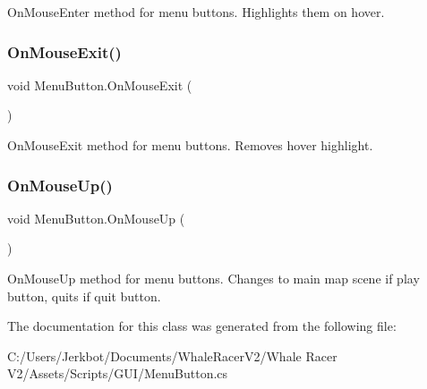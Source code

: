 On\+Mouse\+Enter method for menu buttons. Highlights them on hover. 

\mbox{\label{class_menu_button_afae57d1cdf53ab95aaad3ffafcdd5682}} 
\subsubsection{\texorpdfstring{On\+Mouse\+Exit()}{OnMouseExit()}}
{\footnotesize\ttfamily void Menu\+Button.\+On\+Mouse\+Exit (\begin{DoxyParamCaption}{ }\end{DoxyParamCaption})\hspace{0.3cm}{\ttfamily [private]}}



On\+Mouse\+Exit method for menu buttons. Removes hover highlight. 

\mbox{\label{class_menu_button_a4e61ff19b24c1f1f521b6a80a5688af9}} 
\subsubsection{\texorpdfstring{On\+Mouse\+Up()}{OnMouseUp()}}
{\footnotesize\ttfamily void Menu\+Button.\+On\+Mouse\+Up (\begin{DoxyParamCaption}{ }\end{DoxyParamCaption})\hspace{0.3cm}{\ttfamily [private]}}



On\+Mouse\+Up method for menu buttons. Changes to main map scene if play button, quits if quit button. 



The documentation for this class was generated from the following file\+:\begin{DoxyCompactItemize}
\item 
C\+:/\+Users/\+Jerkbot/\+Documents/\+Whale\+Racer\+V2/\+Whale Racer V2/\+Assets/\+Scripts/\+G\+U\+I/Menu\+Button.\+cs\end{DoxyCompactItemize}
